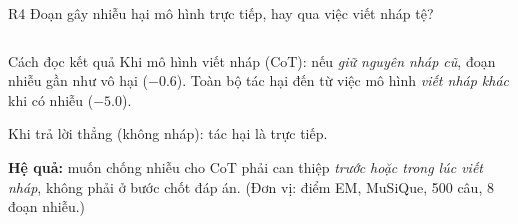 \documentclass[aspectratio=169,t]{beamer}
\begin{document}
\begin{frame}[shrink]{R4 \textperiodcentered{} Đoạn gây nhiễu hại mô hình trực tiếp, hay qua việc viết nháp tệ?}
\begin{columns}[T,onlytextwidth]
\begin{exampleblock}{Cách đọc kết quả}
\scriptsize
Khi mô hình viết nháp (CoT): nếu \emph{giữ nguyên nháp cũ}, đoạn nhiễu gần như vô hại ($-0.6$). Toàn bộ tác hại đến từ việc mô hình \emph{viết nháp khác} khi có nhiễu ($-5.0$).\par\vspace{2pt}
Khi trả lời thẳng (không nháp): tác hại là trực tiếp.\par\vspace{2pt}
\textbf{Hệ quả:} muốn chống nhiễu cho CoT phải can thiệp \emph{trước hoặc trong lúc viết nháp}, không phải ở bước chốt đáp án. (Đơn vị: điểm EM, MuSiQue, 500 câu, 8 đoạn nhiễu.)
\end{exampleblock}
\end{columns}
\par\kern0pt
\end{frame}
\end{document}
